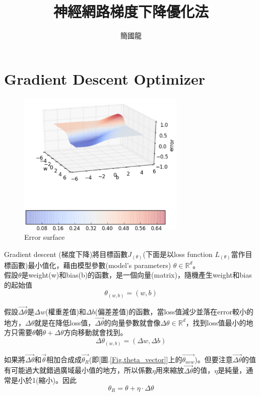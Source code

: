 \documentclass[13pt, a4paper]{report}
\title{神經網路梯度下降優化法}
\author{簡國龍}
\begin{document}
\maketitle
\tableofcontents

\chapter{Gradient Descent Optimizer}
\begin{figure}[hbt!]
\center
\includegraphics[width=8cm]{Error_surface}
\caption{Error surface \href{https://hackernoon.com/the-reason-behind-moving-in-the-direction-opposite-to-the-gradient-f9566b95370b}{\faLink}}\label{Fig.Error_surface} 
\end{figure}
Gradient descent (梯度下降)將目標函數$J_{(\theta)}$(下面是以loss function $L_{(\theta)}$當作目標函數)最小值化，藉由模型參數(model's parameters) $\theta \in \mathbb{R}^d$。\\
假設$\theta$是weight(w)和bias(b)的函數，是一個向量(matrix)，隨機產生weight和bias的起始值
$$\theta_{(w, b)}=(w, b)$$

假設$\overrightarrow{\Delta\theta}$是$\Delta w$(權重差值)和$\Delta b$(偏差差值)的函數，當loss值減少並落在error較小的地方，$\Delta\theta$就是在降低loss值，$\overrightarrow{\Delta\theta}$的向量參數就會像$\Delta\theta \in \mathbb{R}^d$，找到loss值最小的地方只需要$\theta$朝$\theta+\Delta\theta$方向移動就會找到。
$$\Delta\theta_{(w, b)}=(\Delta w, \Delta b)$$

如果將$\overrightarrow{\Delta\theta}$和$\overrightarrow{\theta}$相加合成成$\overrightarrow{\theta_{R}}$(即[圖.\ref{Fig.theta_vector}]上的$\overrightarrow{\theta_{new}}$)。但要注意$\overrightarrow{\Delta\theta}$的值有可能過大就錯過廣域最小值的地方，所以係數$\eta$用來縮放$\overrightarrow{\Delta\theta}$的值，$\eta$是純量，通常是小於1(縮小)。因此
$$\theta_{R}=\theta+\eta\cdot\Delta\theta$$
\end{document}
